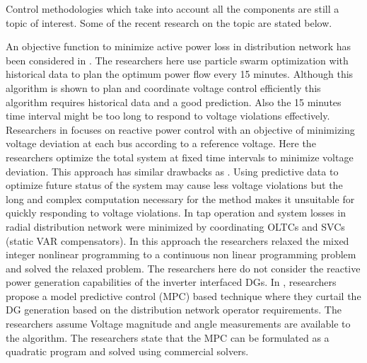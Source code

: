 Control methodologies which take into account all the components are still a topic of interest. Some of the recent research on the topic are stated below.


An objective function to minimize active power loss in distribution network has been considered in \cite{CE_VC_1}. The researchers here use particle swarm optimization with historical data to plan the optimum power flow every 15 minutes. Although this algorithm is shown to plan and coordinate voltage control efficiently this algorithm requires historical data and a good prediction. Also the 15 minutes time interval might be too long to respond to voltage violations effectively. Researchers in \cite{CE_VC_2} focuses on reactive power control with an objective of minimizing voltage deviation at each bus according to a reference voltage. Here the researchers optimize the total system at fixed time intervals to minimize voltage deviation. This approach has similar drawbacks as \cite{CE_VC_1}. Using predictive data to optimize future status of the system may cause less voltage violations but the long and complex computation necessary for the method makes it unsuitable for quickly responding to voltage violations. 
In \cite{CE_VC_4} tap operation and system losses in radial distribution network were minimized by coordinating OLTCs and SVCs (static VAR compensators). In this approach the researchers relaxed the mixed integer nonlinear programming to a continuous non linear programming problem and solved the relaxed problem. The researchers here do not consider the  reactive power generation capabilities of the inverter interfaced DGs.
In \cite{NLR_1}, researchers propose a model predictive control (MPC) based technique where they curtail the DG generation based on the distribution network operator requirements. The researchers assume Voltage magnitude and angle measurements are available to the algorithm. The researchers state that the MPC can be formulated as a quadratic program and solved using commercial solvers.
